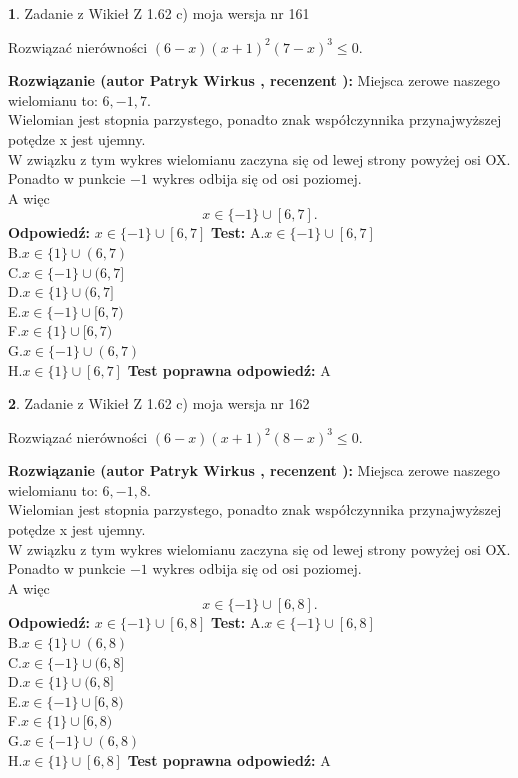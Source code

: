 \documentclass[12pt, a4paper]{article}
\theoremstyle{definition} %
\newtheorem{zad}{}
\newcommand{\zadStart}[1]{\begin{zad}#1\newline}
\newcommand{\zadStop}{\end{zad}}
\newcommand{\rozwStart}[2]{\noindent \textbf{Rozwiązanie (autor #1 , recenzent #2): }\newline}
\newcommand{\rozwStop}{\newline}
\newcommand{\odpStart}{\noindent \textbf{Odpowiedź:}\newline}
\newcommand{\odpStop}{\newline}
\newcommand{\testStart}{\noindent \textbf{Test:}\newline}
\newcommand{\testStop}{\newline}
\newcommand{\kluczStart}{\noindent \textbf{Test poprawna odpowiedź:}\newline}
\newcommand{\kluczStop}{\newline}
\begin{document}
\zadStart{Zadanie z Wikieł Z 1.62 c) moja wersja nr 161}

Rozwiązać nierówności $(6-x)(x+1)^{2}(7-x)^{3}\le0$.
\zadStop
\rozwStart{Patryk Wirkus}{}
Miejsca zerowe naszego wielomianu to: $6, -1, 7$.\\
Wielomian jest stopnia parzystego, ponadto znak współczynnika przy\linebreak najwyższej potędze x jest ujemny.\\ W związku z tym wykres wielomianu zaczyna się od lewej strony powyżej osi OX.\\
Ponadto w punkcie $-1$ wykres odbija się od osi poziomej.\\
A więc $$x \in \{-1\} \cup [6,7].$$
\rozwStop
\odpStart
$x \in \{-1\} \cup [6,7]$
\odpStop
\testStart
A.$x \in \{-1\} \cup [6,7]$\\
B.$x \in \{1\} \cup (6,7)$\\
C.$x \in \{-1\} \cup (6,7]$\\
D.$x \in \{1\} \cup (6,7]$\\
E.$x \in \{-1\} \cup [6,7)$\\
F.$x \in \{1\} \cup [6,7)$\\
G.$x \in \{-1\} \cup (6,7)$\\
H.$x \in \{1\} \cup [6,7]$
\testStop
\kluczStart
A
\kluczStop



\zadStart{Zadanie z Wikieł Z 1.62 c) moja wersja nr 162}

Rozwiązać nierówności $(6-x)(x+1)^{2}(8-x)^{3}\le0$.
\zadStop
\rozwStart{Patryk Wirkus}{}
Miejsca zerowe naszego wielomianu to: $6, -1, 8$.\\
Wielomian jest stopnia parzystego, ponadto znak współczynnika przy\linebreak najwyższej potędze x jest ujemny.\\ W związku z tym wykres wielomianu zaczyna się od lewej strony powyżej osi OX.\\
Ponadto w punkcie $-1$ wykres odbija się od osi poziomej.\\
A więc $$x \in \{-1\} \cup [6,8].$$
\rozwStop
\odpStart
$x \in \{-1\} \cup [6,8]$
\odpStop
\testStart
A.$x \in \{-1\} \cup [6,8]$\\
B.$x \in \{1\} \cup (6,8)$\\
C.$x \in \{-1\} \cup (6,8]$\\
D.$x \in \{1\} \cup (6,8]$\\
E.$x \in \{-1\} \cup [6,8)$\\
F.$x \in \{1\} \cup [6,8)$\\
G.$x \in \{-1\} \cup (6,8)$\\
H.$x \in \{1\} \cup [6,8]$
\testStop
\kluczStart
A
\kluczStop
\end{document}
